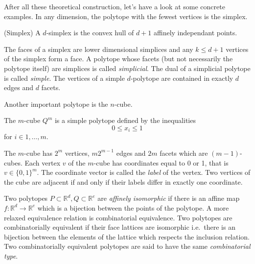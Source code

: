 After all these theoretical construction, let's have a look at some concrete examples.
In any dimension, the polytope with the fewest vertices is the simplex. 
\begin{definition}
 (Simplex) A $d$-simplex is the convex hull of $d+1$ affinely independant 
points.
\end{definition}
The faces of a simplex are lower dimensional simplices and any $k\le d+1$ vertices
of the simplex form a face. 
 A polytope whose facets 
(but not necessarily the polytope itself) are simplices is called 
\textit{simplicial}. The dual of a simplicial polytope is called 
\textit{simple}. The vertices of a simple $d$-polytope are contained in exactly 
$d$ edges and $d$ facets. 

Another important polytope is the $n$-cube.

\begin{definition}
 The $m$-cube $Q^m$ is a simple polytope defined by the inequalities
\begin{equation}
 0 \leq x_i \leq 1 
\end{equation}
for $i \in 1,\dots, m$.
\end{definition}
The $m$-cube has $2^m$ vertices, $m2^{m-1}$ edges and $2m$ facets which
are $(m-1)$-cubes. Each vertex $v$ of the $m$-cube has coordinates equal to 0 
or 1, that is $v\in \{0,1\}^m$. The coordinate vector is called the 
\textit{label} of the vertex. Two vertices of the cube are adjacent if and only 
if their labels differ in exactly one coordinate.

Two polytopes $P\subset \mathbb{R}^d, Q \subset \mathbb{R}^e$ are 
\textit{affinely isomorphic} if there is an affine map $f: \mathbb{R}^d 
\rightarrow \mathbb{R}^e$ which is a bijection between the points of the 
polytope. A more relaxed equivalence relation is combinatorial equivalence. Two 
polytopes are combinatorially equivalent if their face lattices are isomorphic 
i.e.\ there is an bijection between the elements of the lattice which respects 
the inclusion relation. Two combinatorially equivalent polytopes are said to have the 
same \textit{combinatorial type}.

